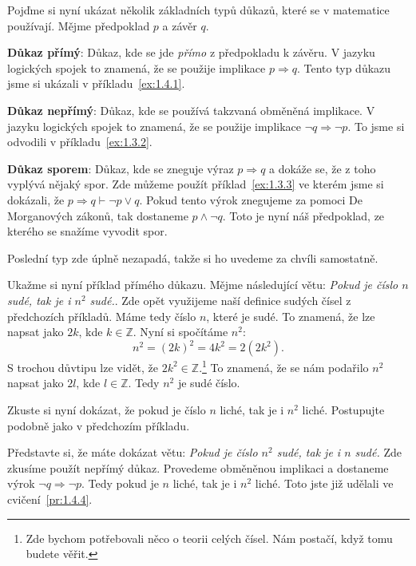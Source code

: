\begin{definitionbox}
  Pojďme si nyní ukázat několik základních typů důkazů, které se v matematice používají. Mějme předpoklad $p$ a závěr $q$.

  \textbf{Důkaz přímý}: Důkaz, kde se jde \textit{přímo} z předpokladu k závěru. V jazyku logických spojek to znamená, že se použije implikace $p \Rightarrow q$. Tento typ důkazu jsme si ukázali v příkladu~\ref{ex:1.4.1}.

  \textbf{Důkaz nepřímý}: Důkaz, kde se používá takzvaná obměněná implikace. V jazyku logických spojek to znamená, že se použije implikace $\neg q \Rightarrow \neg p$. To jsme si odvodili v příkladu~\ref{ex:1.3.2}.

  \textbf{Důkaz sporem}: Důkaz, kde se zneguje výraz $p \Rightarrow q$ a dokáže se, že z toho vyplývá nějaký spor. Zde můžeme použít příklad~\ref{ex:1.3.3} ve kterém jsme si dokázali, že $p\Rightarrow q \vdash \neg p \lor q$. Pokud tento výrok znegujeme za pomoci De Morganových zákonů, tak dostaneme $p \land \neg q$. Toto je nyní náš předpoklad, ze kterého se snažíme vyvodit spor. 

  \vspace{0.1cm}

  Poslední typ zde úplně nezapadá, takže si ho uvedeme za chvíli samostatně.
\end{definitionbox}

\begin{example}
  Ukažme si nyní příklad přímého důkazu. Mějme následující větu: \textit{Pokud je číslo $n$ sudé, tak je i $n^2$ sudé.}. Zde opět využijeme naší definice sudých čísel z předchozích příkladů. Máme tedy číslo $n$, které je sudé. To znamená, že lze napsat jako $2k$, kde $k\in\mathbb{Z}$. Nyní si spočítáme $n^2$: 
  \begin{equation}
    n^2 = (2k)^2 = 4k^2 = 2(2k^2).
  \end{equation}
  S trochou důvtipu lze vidět, že $2k^2 \in \mathbb{Z}$.\footnote{Zde bychom potřebovali něco o teorii celých čísel. Nám postačí, když tomu budete věřit.} To znamená, že se nám podařilo $n^2$ napsat jako $2l$, kde $l\in\mathbb{Z}$. Tedy $n^2$ je sudé číslo.
\end{example}
\begin{problem}
  Zkuste si nyní dokázat, že pokud je číslo $n$ liché, tak je i $n^2$ liché. Postupujte podobně jako v předchozím příkladu.
\end{problem}

\begin{example} 
  Představte si, že máte dokázat větu: \textit{Pokud je číslo $n^2$ sudé, tak je i $n$ sudé.} Zde zkusíme použít nepřímý důkaz. Provedeme obměněnou implikaci a dostaneme výrok $\neg q \Rightarrow \neg p$. Tedy pokud je $n$ liché, tak je i $n^2$ liché. Toto jste již udělali ve cvičení~\ref{pr:1.4.4}.
\end{example}


